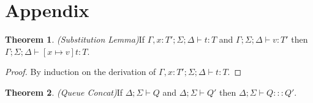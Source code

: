 \documentclass{article}
\theoremstyle{definition}
\newtheorem{thm}{Theorem}[section]
\begin{document}
\newpage
\section{Appendix}

\begin{thm}
\emph{(Substitution Lemma)}\label{th:subst}
If $\Gamma , x : T' ; \Sigma ; \Delta \vdash t : T$ and $\Gamma ; \Sigma ; \Delta \vdash v : T'$ then $\Gamma ; \Sigma ; \Delta \vdash [x \mapsto v]t : T$.
\end{thm}
\begin{proof}
By induction on the derivation of $\Gamma , x : T' ; \Sigma ; \Delta \vdash t : T$.
\end{proof}

\begin{thm}
\emph{(Queue Concat)}\label{lem:queue-concat}
If $\Delta ; \Sigma \vdash Q$ and $\Delta ; \Sigma \vdash Q'$ then $\Delta ; \Sigma \vdash Q ::: Q'$.
\end{thm}
\end{document}
